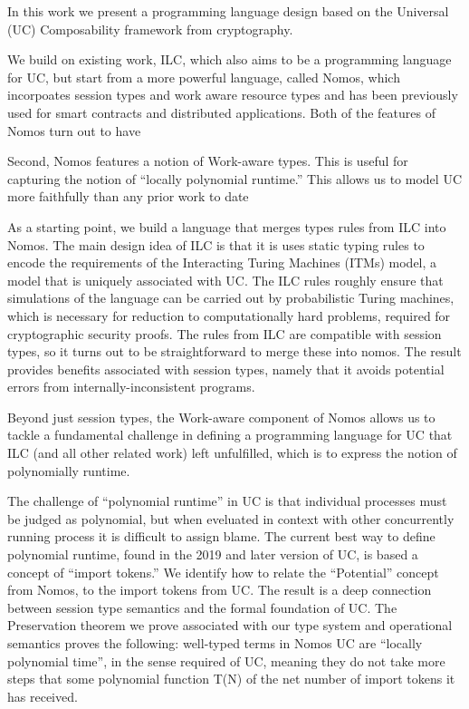 In this work we present a programming language design based on the Universal (UC) Composability framework from cryptography.

We build on existing work, ILC, which also aims to be a programming language for UC, but start from a more powerful language, called Nomos, which incorpoates session types and work aware resource types and has been previously used for  smart contracts and distributed applications.
Both of the features of Nomos turn out to have 

Second, Nomos features a notion of Work-aware types. This is useful for capturing the notion of “locally polynomial runtime.” This allows us to model UC more faithfully than any prior work to date

As a starting point, we build a language that merges types rules from ILC into Nomos. The main design idea of ILC is that it is uses static typing rules to encode the requirements of the Interacting Turing Machines (ITMs) model, a model that is uniquely associated with UC. The ILC rules roughly ensure that simulations of the language can be carried out by probabilistic Turing machines, which is necessary for reduction to computationally hard problems, required for cryptographic security proofs. The rules from ILC are compatible with session types, so it turns out to be straightforward to merge these into nomos. The result provides benefits associated with session types, namely that it avoids potential errors from internally-inconsistent programs.

   Beyond just session types, the Work-aware component of Nomos allows us to tackle a fundamental challenge in defining a programming language for UC that ILC (and all other related work) left unfulfilled, which is to express the notion of polynomially runtime.
   
   The challenge of “polynomial runtime” in UC is that individual processes must be judged as polynomial, but when eveluated in context with other concurrently running process it is difficult to assign blame.
       The current best way to define polynomial runtime, found in the 2019 and later version of UC, is based a concept of ``import tokens.''
   We identify how to relate the “Potential” concept from Nomos, to the import tokens from UC. 
	The result is a deep connection between session type semantics and the formal foundation of UC.
	The Preservation theorem we prove associated with our type system and operational semantics proves the following: 
well-typed terms in Nomos UC are “locally polynomial time”, in the sense required of UC, meaning they do not take more steps that some polynomial function T(N) of the net number of import tokens it has received.

